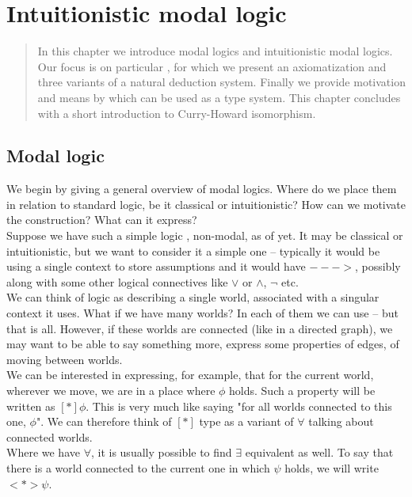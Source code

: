 \chapter{Intuitionistic modal logic}\label{chapter:logic}

\begin{quote}
\small
In this chapter we introduce modal logics and intuitionistic modal logics. Our focus is on particular \logic{}, for which we present an axiomatization and three variants  of a natural deduction system. Finally we provide motivation and means by which \logic{} can be used as a type system. This chapter concludes with a short introduction to Curry-Howard isomorphism.
\end{quote}

\section{Modal logic}
We begin by giving a general overview of modal logics. Where do we place them in relation to standard logic, be it classical or intuitionistic? How can we motivate the construction? What can it express?\\

Suppose we have such a simple logic \LL{}, non-modal, as of yet. It may be classical or intuitionistic, but we want to consider it a simple one -- typically it would be using a single context to store assumptions and it would have $--->$, possibly along with some other logical connectives like $\vee$ or $\wedge$, $\neg$ etc.\\
We can think of logic \LL{} as describing a single world, associated with a singular context it uses. What if we have many worlds? In each of them we can use \LL{} -- but that is all. However, if these worlds are connected (like in a directed graph), we may want to be able to say something more, express some properties of edges, of moving between worlds.\\

We can be interested in expressing, for example, that for the current world, wherever we move, we are in a place where $\phi$ holds. Such a property will be written as $[*]\phi$. This is very much like saying "for all worlds connected to this one, $\phi$". We can therefore think of $[*]$ type as a variant of $\forall$ talking about connected worlds.\\
Where we have $\forall$, it is usually possible to find $\exists$ equivalent as well. To say that there is a world connected to the current one in which $\psi$ holds, we will write $<*>\psi$.\\

